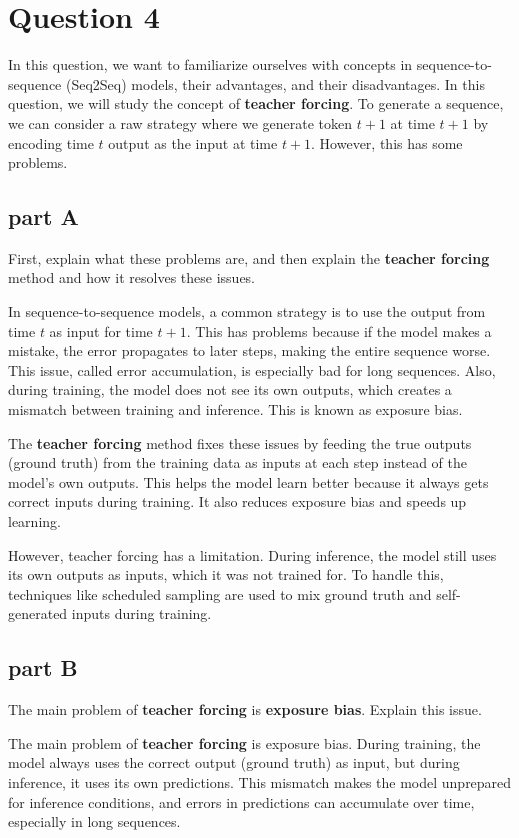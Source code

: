 \section{Question 4 }

In this question, we want to familiarize ourselves with concepts in sequence-to-sequence (Seq2Seq) models, their advantages, and their disadvantages. In this question, we will study the concept of \textbf{teacher forcing}. To generate a sequence, we can consider a raw strategy where we generate token $t+1$ at time $t+1$ by encoding time $t$ output as the input at time $t+1$. However, this has some problems.

\subsection{part A}
First, explain what these problems are, and then explain the \textbf{teacher forcing} method and how it resolves these issues.

\begin{qsolve}
  \begin{qsolve}[]
    In sequence-to-sequence models, a common strategy is to use the output from time \( t \) as input for time \( t+1 \). This has problems because if the model makes a mistake, the error propagates to later steps, making the entire sequence worse. This issue, called error accumulation, is especially bad for long sequences. Also, during training, the model does not see its own outputs, which creates a mismatch between training and inference. This is known as exposure bias.

    The \textbf{teacher forcing} method fixes these issues by feeding the true outputs (ground truth) from the training data as inputs at each step instead of the model's own outputs. This helps the model learn better because it always gets correct inputs during training. It also reduces exposure bias and speeds up learning.

    However, teacher forcing has a limitation. During inference, the model still uses its own outputs as inputs, which it was not trained for. To handle this, techniques like scheduled sampling are used to mix ground truth and self-generated inputs during training.

  \end{qsolve}
\end{qsolve}
\subsection{part B}
The main problem of \textbf{teacher forcing} is \textbf{exposure bias}. Explain this issue.
\begin{qsolve}
  \begin{qsolve}[]
    The main problem of \textbf{teacher forcing} is exposure bias. During training, the model always uses the correct output (ground truth) as input, but during inference, it uses its own predictions. This mismatch makes the model unprepared for inference conditions, and errors in predictions can accumulate over time, especially in long sequences.
  \end{qsolve}
\end{qsolve}
